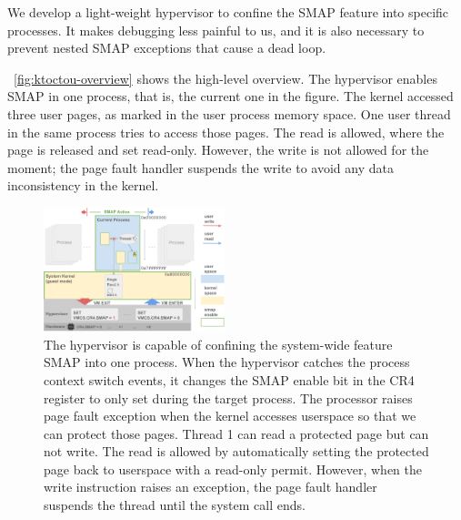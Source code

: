 We develop a light-weight hypervisor to confine the SMAP feature into specific processes. It makes debugging less painful to us, and it is also necessary to prevent nested SMAP exceptions that cause a dead loop.

~\autoref{fig:ktoctou-overview} shows the high-level overview. The hypervisor enables SMAP in one process, that is, the current one in the figure. The kernel accessed three user pages, as marked in the user process memory space. One user thread in the same process tries to access those pages. The read is allowed, where the page is released and set read-only. However, the write is not allowed for the moment; the page fault handler suspends the write to avoid any data inconsistency in the kernel.


\begin{figure}[th]
  \includegraphics[width=0.47\textwidth]{figures/ktoctou-overview2}
  \centering
  \caption{The hypervisor is capable of confining the system-wide feature SMAP into one process. When the hypervisor catches the process context switch events, it changes the SMAP enable bit in the CR4 register to only set during the target process. The processor raises page fault exception when the kernel accesses userspace so that we can protect those pages. Thread 1 can read a protected page but can not write. The read is allowed by automatically setting the protected page back to userspace with a read-only permit. However, when the write instruction raises an exception, the page fault handler suspends the thread until the system call ends.}
  \label{fig:ktoctou-overview}
\end{figure}
